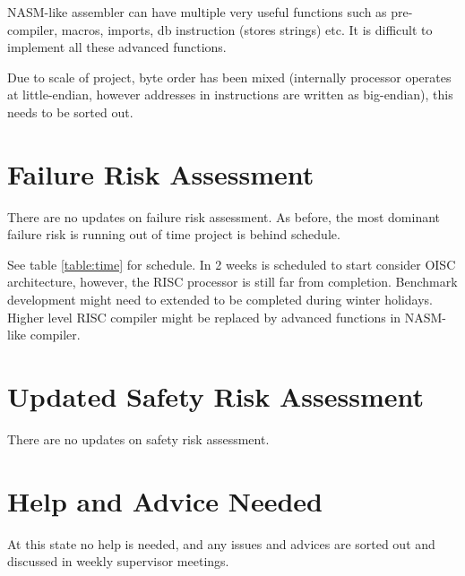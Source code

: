\documentclass[a4paper,11pt]{article}
\begin{document}
NASM-like assembler can have multiple very useful functions such as pre-compiler, macros, imports, db instruction (stores strings) etc. It is difficult to implement all these advanced functions. 

Due to scale of project, byte order has been mixed (internally processor operates at little-endian, however addresses in instructions are written as big-endian), this needs to be sorted out.

\section{Failure Risk Assessment}
There are no updates on failure risk assessment. As before, the most dominant failure risk is running out of time project is behind schedule. 

See table \ref{table:time} for schedule. In 2 weeks is scheduled to start consider OISC architecture, however, the RISC processor is still far from completion. Benchmark development might need to extended to be completed during winter holidays. Higher level RISC compiler might be replaced by advanced functions in NASM-like compiler. 

\section{Updated Safety Risk Assessment}
There are no updates on safety risk assessment.

\section{Help and Advice Needed}
At this state no help is needed, and any issues and advices are sorted out and discussed in weekly supervisor meetings.
\end{document}
